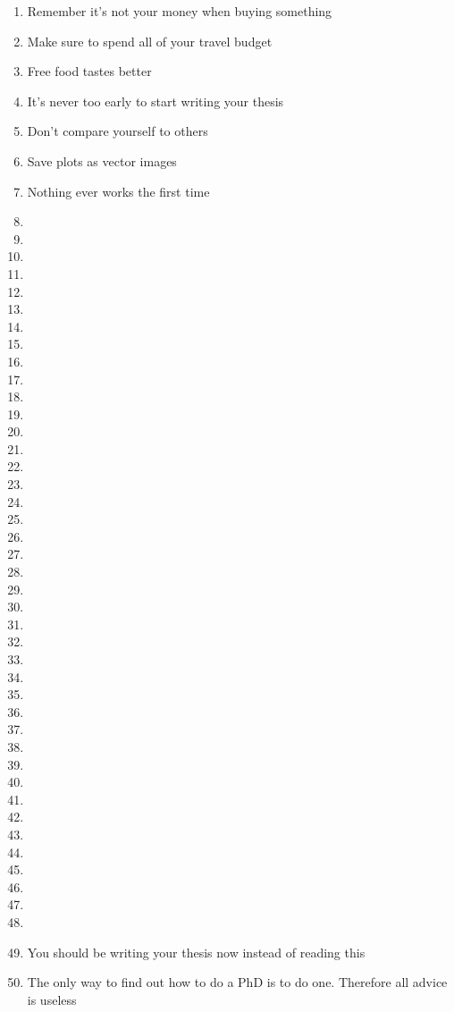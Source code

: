 \begin{enumerate}
	\item Remember it's not your money when buying something
	\item Make sure to spend all of your travel budget
	\item Free food tastes better
	\item It's never too early to start writing your thesis
	\item Don't compare yourself to others
	\item Save plots as vector images
	\item Nothing ever works the first time 
	\item
	\item
	\item
	\item
	\item
	\item
	\item
	\item
	\item
	\item
	\item
	\item
	\item
	\item 
	\item 
	\item 
	\item 
	\item 
	\item 
	\item 
	\item
	\item
	\item
	\item
	\item
	\item
	\item
	\item
	\item
	\item
	\item
	\item
	\item
	\item
	\item
	\item
	\item
	\item
	\item
	\item
	\item
	\item You should be writing your thesis now instead of reading this
	\item The only way to find out how to do a PhD is to do one. Therefore all advice is useless\cite{richardbutterworth}
\end{enumerate}








\